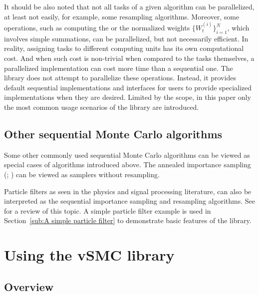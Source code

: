 \documentclass[11pt, fontset=Minion, showoverfull,
bib, biblatexstyle=numeric, mintcode, minted=cache]{marticle}
\begin{document}
It should be also noted that not all tasks of a given \smc algorithm can be
parallelized, at least not easily, for example, some resampling algorithms.
Moreover, some operations, such as computing the \ess or the normalized
weights $\{W_t^{(i)}\}_{i=1}^N$, which involves simple summations, can be
parallelized, but not necessarily efficient. In reality, assigning tasks to
different computing units has its own computational cost. And when such cost
is non-trivial when compared to the tasks themselves, a parallelized
implementation can cost more time than a sequential one. The \vsmc library
does not attempt to parallelize these operations. Instead, it provides default
sequential implementations and interfaces for users to provide specialized
implementations when they are desired. Limited by the scope, in this paper
only the most common usage scenarios of the library are introduced.

\subsection{Other sequential Monte Carlo algorithms}
\label{sub:Other sequential Monte Carlo algorithms}

Some other commonly used sequential Monte Carlo algorithms can be viewed as
special cases of algorithms introduced above. The annealed importance sampling
(\ais; \cite{Neal:2001we}) can be viewed as \smc samplers without resampling.

Particle filters as seen in the physics and signal processing literature, can
also be interpreted as the sequential importance sampling and resampling
algorithms. See \cite{Doucet:2011us} for a review of this topic. A simple
particle filter example is used in Section~\ref{sub:A simple particle filter}
to demonstrate basic features of the \vsmc library.

\section{Using the vSMC library}
\label{sec:Using the vSMC library}

\subsection{Overview}
\end{document}
